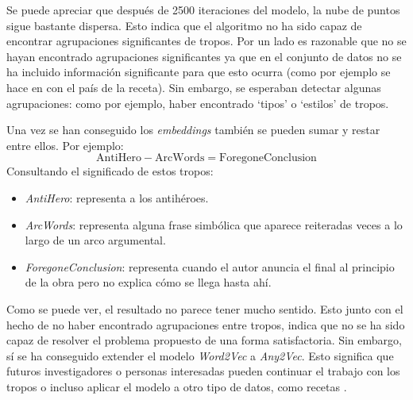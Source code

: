 Se puede apreciar que después de 2500 iteraciones del modelo, la nube de puntos sigue bastante dispersa. Esto indica que el algoritmo no ha sido capaz de encontrar
agrupaciones significantes de tropos. Por un lado es razonable que no se hayan encontrado agrupaciones significantes ya que en el conjunto de datos no se ha incluido
información significante para que esto ocurra (como por ejemplo se hace en \cite{kazama2018neural} con el país de la receta). Sin embargo, se esperaban detectar algunas
agrupaciones: como por ejemplo, haber encontrado `tipos' o `estilos' de tropos.

Una vez se han conseguido los \textit{embeddings} también se pueden sumar y restar entre ellos. Por ejemplo:
\begin{equation}
  \text{AntiHero} - \text{ArcWords} = \text{ForegoneConclusion}
\end{equation}
Consultando el significado de estos tropos:
\begin{itemize}
  \item \textit{AntiHero}: representa a los antihéroes.
  \item \textit{ArcWords}: representa alguna frase simbólica que aparece reiteradas veces a lo largo de un arco argumental.
  \item \textit{ForegoneConclusion}: representa cuando el autor anuncia el final al principio de la obra pero no explica cómo se llega hasta ahí.
\end{itemize}
Como se puede ver, el resultado no parece tener mucho sentido. Esto junto con el hecho de no haber encontrado agrupaciones entre tropos, indica que no se ha sido capaz
de resolver el problema propuesto de una forma satisfactoria. Sin embargo, sí se ha conseguido extender el modelo \textit{Word2Vec} a \textit{Any2Vec}. Esto significa
que futuros investigadores o personas interesadas pueden continuar el trabajo con los tropos o incluso aplicar el modelo a otro tipo de datos, como recetas \cite{kazama2018neural}.